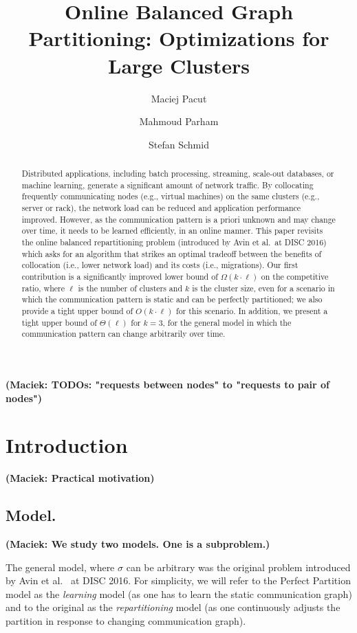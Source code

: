 \documentclass[manuscript,screen=true, review, anonymous]{acmart}
\title{Online Balanced Graph Partitioning: Optimizations for Large Clusters}
\author{Maciej Pacut}
\affiliation{%
 \institution{Faculty of Computer Science, University of Vienna}
 \country{Austria}
 }
\author{Mahmoud Parham}
\affiliation{%
 \institution{Faculty of Computer Science, University of Vienna}
 \country{Austria}
 }
\author{Stefan Schmid}
\affiliation{%
 \institution{Faculty of Computer Science, University of Vienna}
 \country{Austria}
 }
\newcommand\maciek[1]{\color{brown}\textbf{(Maciek: #1)}\color{black}}
\begin{document}
\begin{abstract}
	Distributed   applications,  including  batch  processing, streaming, scale-out databases,
	or machine learning, generate a significant amount of network traffic. By collocating frequently communicating nodes (e.g., virtual machines) on the same clusters (e.g., server or rack), the network load can be reduced and application performance improved. 
	However, as the communication pattern is a priori unknown and may change over time, it needs to be learned efficiently, in an online manner.
	This paper revisits the online 
	balanced repartitioning problem 
	(introduced by Avin et al.~at DISC 2016)
	which asks for an algorithm that strikes
	an optimal tradeoff between the benefits
	of collocation (i.e., lower network load) 
	and its costs (i.e., migrations). 
	Our first contribution is a significantly improved
	lower bound of $\Omega(k\cdot \ell)$ on the
	competitive ratio, where $\ell$ is the number
	of clusters and $k$ is the cluster size,
	even for a scenario in which the communication
	pattern is static and can be perfectly partitioned;
	we also provide a tight upper bound 
	of $O(k\cdot \ell)$ for this scenario.
	In addition, we present a tight upper bound
	of $\Theta(\ell)$ for $k=3$,
	for the general model in which the
	communication pattern can change arbitrarily
	over time. 
\end{abstract}

\maketitle

\renewcommand{\shortauthors}{M.~Pacut, M.~Parham, S.~Schmid}

\maciek{TODOs: "requests between nodes" to "requests to pair of nodes"}

\section{Introduction}

\maciek{Practical motivation}

\subsection{Model.}

\maciek{We study two models. One is a subproblem.}

The general model, where $\sigma$ can be arbitrary
was the original problem introduced
by Avin et al.~\cite{repartition-disc} at DISC 2016.
For simplicity, we will refer to the Perfect Partition
model as the \emph{learning} model (as
one has to learn the static communication graph) 
and to the original as the \emph{repartitioning} model (as one continuously adjusts the partition in response to changing communication graph).
\end{document}
